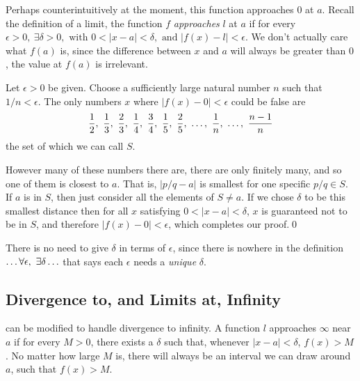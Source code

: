 \documentclass[10pt]{book}
\newcommand{\newthought}[1]{\vspace{0.5\baselineskip}\noindent{\scshape #1}}
\begin{document}
Perhaps counterintuitively at the moment, this function approaches $0$ at $a$.
Recall the definition of a limit, the function $f$ \emph{approaches} $l$ at $a$ if for every
$\epsilon > 0, \ \exists \delta > 0, \text{ with }0< |x-a|<\delta, \text{ and } |f(x)-l|< \epsilon$.
We don't actually care what $f(a)$ is, since the difference between $x$ and $a$ will always be greater
than $0$, the value at $f(a)$ is irrelevant.

Let $\epsilon > 0$ be given. Choose a sufficiently large
natural number $n$ such that $1/n < \epsilon$. The only numbers $x$ where $|f(x)-0|<\epsilon$ could be false are
\[
  \frac12,\ \frac13,\ \frac23,\ \frac14,\ \frac34,\ \frac15,\ \frac25,\ \mathellipsis,\ \frac{1}{n},\ \mathellipsis,\ \frac{n-1}{n}
\]
the set of which we can call $S$.

However many of these numbers there are, there are only finitely many, and so one of them is closest to $a$. That is,
$|p/q-a|$ is smallest for one specific $p/q \in S$. If $a$ is in $S$, then just consider all the elements of $S \ne a$.
If we chose $\delta$ to be this smallest distance then for all $x$ satisfying $0 < |x-a| < \delta$, $x$ is
guaranteed not
to be in $S$, and therefore $|f(x)-0|<\epsilon$, which completes our proof.\qed\

There is no need to give $\delta$ in terms of $\epsilon$, since there is nowhere in the definition
$\mathellipsis \forall \epsilon, \ \exists \delta \mathellipsis$ that says each $\epsilon$ needs a
\emph{unique} $\delta$.

\subsection{Divergence to, and Limits at, Infinity}
\newthought{The definition of a limit} can be modified to handle divergence to infinity. A function $l$
approaches $\infty$ near $a$
if for every $M > 0$, there exists a $\delta$ such that, whenever $|x-a| < \delta$, $f(x) > M$. No matter how
large $M$ is, there will
always be an interval we can draw around $a$, such that $f(x) > M$.
\end{document}
